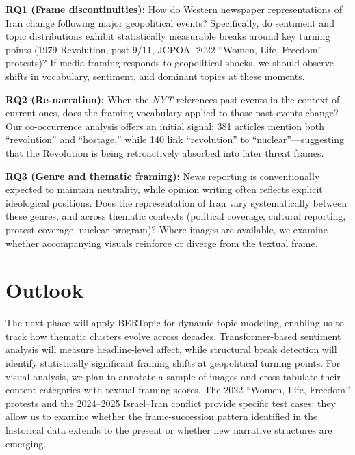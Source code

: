 \documentclass{dhnbpub}
\begin{document}
\textbf{RQ1 (Frame discontinuities):} How do Western newspaper representations of Iran change following major geopolitical events? Specifically, do sentiment and topic distributions exhibit statistically measurable breaks around key turning points (1979 Revolution, post-9/11, JCPOA, 2022 ``Women, Life, Freedom'' protests)? If media framing responds to geopolitical shocks, we should observe shifts in vocabulary, sentiment, and dominant topics at these moments.

\textbf{RQ2 (Re-narration):} When the \textit{NYT} references past events in the context of current ones, does the framing vocabulary applied to those past events change? Our co-occurrence analysis offers an initial signal: 381 articles mention both ``revolution'' and ``hostage,'' while 140 link ``revolution'' to ``nuclear''---suggesting that the Revolution is being retroactively absorbed into later threat frames.

\textbf{RQ3 (Genre and thematic framing):} News reporting is conventionally expected to maintain neutrality, while opinion writing often reflects explicit ideological positions. Does the representation of Iran vary systematically between these genres, and across thematic contexts (political coverage, cultural reporting, protest coverage, nuclear program)? Where images are available, we examine whether accompanying visuals reinforce or diverge from the textual frame.

\section{Outlook}

The next phase will apply BERTopic \citep{Grootendorst2022} for dynamic topic modeling, enabling us to track how thematic clusters evolve across decades. Transformer-based sentiment analysis will measure headline-level affect, while structural break detection will identify statistically significant framing shifts at geopolitical turning points. For visual analysis, we plan to annotate a sample of images and cross-tabulate their content categories with textual framing scores. The 2022 ``Women, Life, Freedom'' protests and the 2024--2025 Israel--Iran conflict provide specific test cases: they allow us to examine whether the frame-succession pattern identified in the historical data extends to the present or whether new narrative structures are emerging.

\printbibliography
\end{document}
